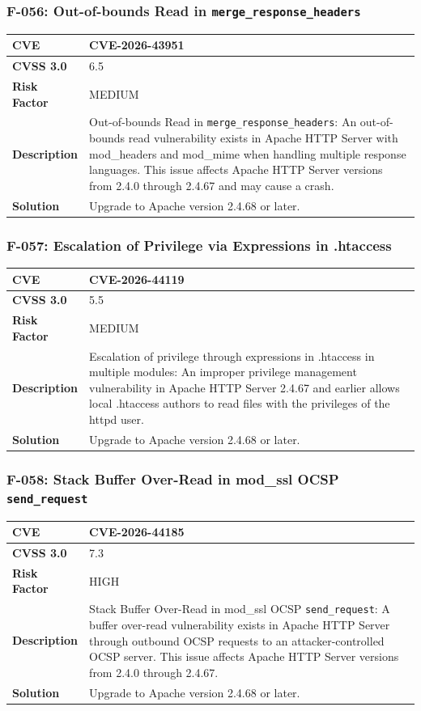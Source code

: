 \subsubsection{F-056: Out-of-bounds Read in \texttt{merge\_response\_headers}}
\begin{tabular}{|p{2.8cm}|p{12.2cm}|}
\hline
\textbf{CVE} & CVE-2026-43951 \\ \hline
\textbf{CVSS 3.0} & 6.5 \\ \hline
\textbf{Risk Factor} & MEDIUM \\ \hline
\textbf{Description} & Out-of-bounds Read in \texttt{merge\_response\_headers}: An out-of-bounds read vulnerability exists in Apache HTTP Server with mod\_headers and mod\_mime when handling multiple response languages. This issue affects Apache HTTP Server versions from 2.4.0 through 2.4.67 and may cause a crash. \\ \hline
\textbf{Solution} & Upgrade to Apache version 2.4.68 or later. \\ \hline
\end{tabular}

\subsubsection{F-057: Escalation of Privilege via Expressions in .htaccess}
\begin{tabular}{|p{2.8cm}|p{12.2cm}|}
\hline
\textbf{CVE} & CVE-2026-44119 \\ \hline
\textbf{CVSS 3.0} & 5.5 \\ \hline
\textbf{Risk Factor} & MEDIUM \\ \hline
\textbf{Description} & Escalation of privilege through expressions in .htaccess in multiple modules: An improper privilege management vulnerability in Apache HTTP Server 2.4.67 and earlier allows local .htaccess authors to read files with the privileges of the httpd user. \\ \hline
\textbf{Solution} & Upgrade to Apache version 2.4.68 or later. \\ \hline
\end{tabular}

\subsubsection{F-058: Stack Buffer Over-Read in mod\_ssl OCSP \texttt{send\_request}}
\begin{tabular}{|p{2.8cm}|p{12.2cm}|}
\hline
\textbf{CVE} & CVE-2026-44185 \\ \hline
\textbf{CVSS 3.0} & 7.3 \\ \hline
\textbf{Risk Factor} & HIGH \\ \hline
\textbf{Description} & Stack Buffer Over-Read in mod\_ssl OCSP \texttt{send\_request}: A buffer over-read vulnerability exists in Apache HTTP Server through outbound OCSP requests to an attacker-controlled OCSP server. This issue affects Apache HTTP Server versions from 2.4.0 through 2.4.67. \\ \hline
\textbf{Solution} & Upgrade to Apache version 2.4.68 or later. \\ \hline
\end{tabular}

